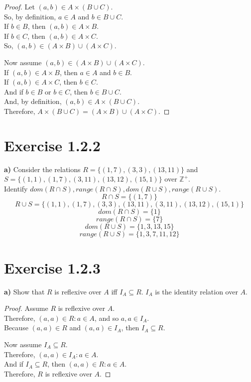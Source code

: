 \documentclass[titlepage, letterpaper, fleqn]{article}
\newcommand{\spacepls}{\vspace{5mm}}
\begin{document}
\begin{proof}
Let \((a,b) \in A \times (B \cup C)\).\\
So, by definition, \(a \in A\) and \(b \in B \cup C\).\\
If \(b \in B\), then \((a,b) \in A \times B\).\\
If \(b \in C\), then \((a,b) \in A \times C\).\\
So, \((a,b) \in (A \times B) \cup (A \times C)\).

\spacepls

Now assume \((a,b) \in (A \times B) \cup (A \times C)\).\\
If \((a,b) \in A \times B\), then \(a \in A\) and \(b \in B\).\\
If \((a,b) \in A \times C\), then \(b \in C\).\\
And if \(b \in B\) or \(b \in C\), then \(b \in B \cup C\).\\
And, by definition, \((a,b) \in A \times (B \cup C)\).\\
Therefore, \(A \times (B \cup C) = (A \times B) \cup (A \times C)\).
\end{proof}

\section{Exercise 1.2.2}

{\large \textbf{a)} Consider the relations \(R = \{(1,7), (3,3), (13,11)\}\) and \\
\(S = \{(1,1), (1,7), (3,11), (13,12), (15,1)\}\) over \(\mathbb{Z}^+\)}.\\
Identify \(dom(R \cap S), range(R \cap S), dom(R \cup S), range(R \cup S)\).
\spacepls
\[R \cap S = \{(1,7)\}\]
\[R \cup S = \{(1,1), (1,7), (3,3), (13, 11), (3, 11), (13,12), (15,1)\}\]
\[dom(R \cap S) = \{1\}\]
\[range(R \cap S) = \{7\}\]
\[dom(R \cup S) = \{1, 3, 13, 15\}\]
\[range(R \cup S) = \{1, 3, 7, 11, 12\}\]

\section{Exercise 1.2.3}

{\large \textbf{a)} Show that \(R\) is reflexive over \(A\) iff \(I_A \subseteq R\).
\(I_A\) is the identity relation over \(A\).}

\begin{proof}
Assume \(R\) is reflexive over \(A\).\\
Therefore, \((a,a) \in R : a \in A\), and so \(a,a \in I_A\).\\
Because \((a,a) \in R\) and \((a,a) \in I_A\), then \(I_A \subseteq R\).

\spacepls

Now assume \(I_A \subseteq R\).\\
Therefore, \((a,a) \in I_A : a \in A\).\\
And if \(I_A \subseteq R\), then \((a,a) \in R : a \in A\).\\
Therefore, \(R\) is reflexive over \(A\).
\end{proof}
\end{document}
